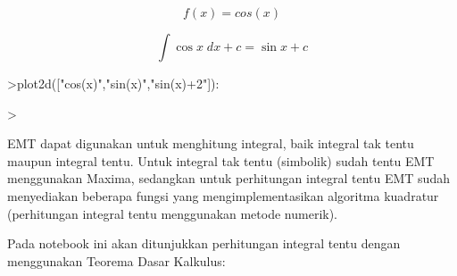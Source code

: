 \documentclass[a4paper,10pt]{article}
\begin{document}
\begin{eulernotebook}
\begin{eulercomment}
\begin{eulercomment}
\begin{eulercomment}
\begin{eulercomment}
\begin{eulercomment}
\end{eulercomment}
\begin{eulerformula}
\[
f(x) = cos(x)
\]
\end{eulerformula}
\begin{eulerformula}
\[
\int {\cos x}{\;dx}+c=\sin x+c
\]
\end{eulerformula}
\begin{eulerprompt}
>plot2d(["cos(x)","sin(x)","sin(x)+2"]):
\end{eulerprompt}
\begin{eulerprompt}
>    
\end{eulerprompt}
\begin{eulercomment}
EMT dapat digunakan untuk menghitung integral, baik integral tak tentu
maupun integral tentu. Untuk integral tak tentu (simbolik) sudah tentu
EMT menggunakan Maxima, sedangkan untuk perhitungan integral tentu EMT
sudah menyediakan beberapa fungsi yang mengimplementasikan algoritma
kuadratur (perhitungan integral tentu menggunakan metode numerik).

Pada notebook ini akan ditunjukkan perhitungan integral tentu dengan
menggunakan Teorema Dasar Kalkulus:


\end{eulercomment}
\end{eulercomment}
\end{eulercomment}
\end{eulercomment}
\end{eulercomment}
\end{eulernotebook}
\end{document}
